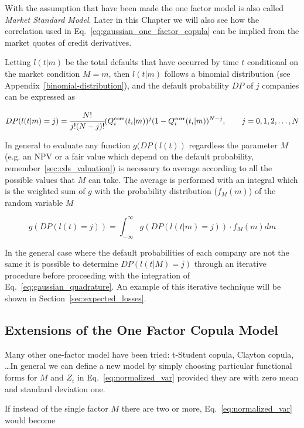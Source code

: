 With the assumption that have been made the one factor model is also called \emph{Market Standard Model}.
Later in this Chapter we will also see how the correlation used in Eq.~\ref{eq:gaussian_one_factor_copula} can be implied from the market quotes of 
credit derivatives.

Letting \(l(t|m)\) be the total defaults that
have occurred by time \(t\) conditional on the market condition
\(M = m\), then \(l(t|m)\) follows a binomial distribution (see Appendix~\ref{binomial-distribution}), and the default probability $DP$ of $j$ companies
can be expressed as

\begin{equation}
DP(l(t|m) = j) = \cfrac{N!}{j!(N-j)!}(Q_i^{\textrm{corr}}(t_i|m))^j(1-Q_i^{\textrm{corr}}(t_i|m))^{N-j},\qquad  j=0, 1, 2,\ldots,N
\end{equation}

In general to evaluate any function $g(DP(l(t))$ regardless the parameter $M$
(e.g. an NPV or a fair value which depend on the default probability, remember~\ref{sec:cds_valuation}) is necessary to average according to all the possible values that $M$ can take. The average is performed with an integral which is the weighted sum of $g$ with the probability distribution ($f_M(m)$) of the random variable $M$  

\begin{equation}
g(DP(l(t) = j)) = \int_{-\infty}^{\infty}{g(DP(l(t|m) = j))\cdot f_M(m)dm}
\label{eq:gaussian_quadrature}
\end{equation}

In the general case where the default probabilities of each company are not the same 
it is possible to determine $DP(l(t|M)=j)$ through an iterative procedure before
proceeding with the integration of Eq.~\ref{eq:gaussian_quadrature}.
An example of this iterative technique will be shown in Section~\ref{sec:expected_losses}.

\subsection{Extensions of the One Factor Copula Model}
Many other one-factor model have been tried: t-Student copula, Clayton copula, \ldots In general we can define a new model by simply choosing particular functional forms for $M$ and $Z_i$ in Eq.~\ref{eq:normalized_var} provided they are with zero mean and standard deviation one. 

If instead of the single factor $M$ there are two or more, Eq.~\ref{eq:normalized_var} would become

